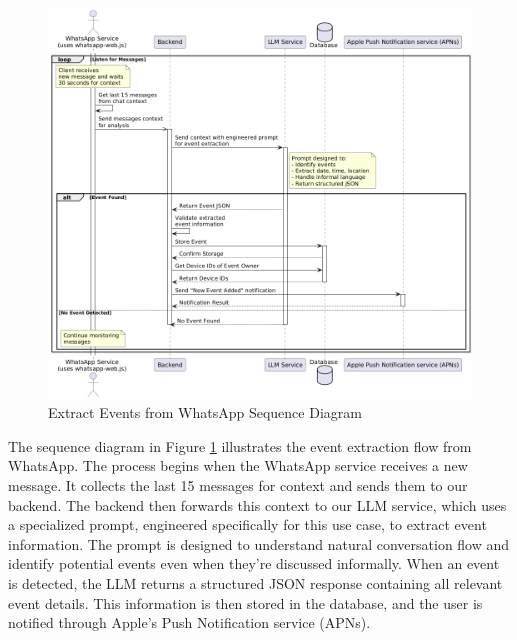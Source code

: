 \begin{figure}[!h]
  \centering
  \includegraphics[width=\textwidth]{images/docs/diagrams/sequence-diagrams/all-sequence-diagrams/Extract Events from WhatsApp.png}
  \caption{Extract Events from WhatsApp Sequence Diagram}
  \label{fig:seq/extract-events-whatsapp}
\end{figure}

The sequence diagram in Figure \ref{fig:seq/extract-events-whatsapp} illustrates the event extraction flow from WhatsApp. The process begins when the WhatsApp service receives a new message. It collects the last 15 messages for context and sends them to our backend. The backend then forwards this context to our LLM service, which uses a specialized prompt, engineered specifically for this use case, to extract event information. The prompt is designed to understand natural conversation flow and identify potential events even when they're discussed informally. When an event is detected, the LLM returns a structured JSON response containing all relevant event details. This information is then stored in the database, and the user is notified through Apple's Push Notification service (APNs).